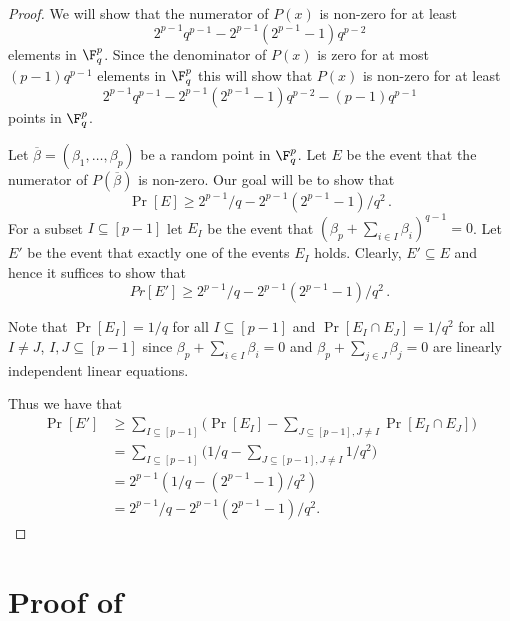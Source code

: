 \begin{proof}
We will show that the numerator of $P(x)$ is non-zero for at least $$2^{p-1}q^{p-1} -  2^{p-1}(2^{p-1}-1)q^{p-2}$$ elements in $\F_q^p$.
Since the denominator of $P(x)$ is zero for at most $(p-1)q^{p-1}$ elements in $ \F_q^p$ this will show that $P(x)$ is non-zero
for at least $$2^{p-1}q^{p-1} -  2^{p-1}(2^{p-1}-1)q^{p-2} - (p-1)q^{p-1}  $$ points in $\F_q^p$.

Let $ \overline \beta = (\beta_1,\ldots, \beta_p) $ be a random point in $\F_q^p$.
Let $E$ be the event that the numerator of $P(\overline \beta)$ is non-zero. Our goal will be to show that  $$\Pr[E] \geq  2^{p-1}/q - 2^{p-1}(2^{p-1}-1)/q^2\,.$$
For a subset $I \subseteq [p-1]$ let
$E_{I}$ be the event that $ (\beta_p + \sum_{i \in I} \beta_i )^{q-1} = 0$. Let $E'$ be the event that exactly one of the events $E_I$ holds. Clearly,
$E' \subseteq E$ and hence it suffices to show that $$Pr[E'] \geq  2^{p-1}/q - 2^{p-1}(2^{p-1}-1)/q^2\,.$$

 Note that $\Pr[E_I] = 1/q$ for all $I \subseteq [p-1]$ and
$\Pr[E_I \cap E_J] = 1/q^2$ for all $I \neq J$, $I,J \subseteq [p-1]$
since $\beta_p + \sum_{i \in I} \beta_i =0 $ and
$\beta_p + \sum_{j \in J} \beta_j = 0$ are linearly independent linear equations.

Thus we have that
%
\begin{align*}
\Pr[E'] &   \geq  \sum_{I \subseteq [p-1]} \bigg(\Pr[E_I] - \sum_{J \subseteq [p-1], J \neq I} \Pr[E_I \cap E_J] \bigg) \\
& = \sum_{I \subseteq [p-1]} \bigg(1/q -  \sum_{J \subseteq [p-1], J \neq I} 1/q^2 \bigg) \\[1ex]
& =   2^{p-1}(1/q - (2^{p-1} - 1)/q^2)  \\[1ex]
& =  2^{p-1}/q - 2^{p-1}(2^{p-1}-1)/q^2.
%
\end{align*}
\end{proof}



\section{Proof of }
\label{sec:final}

